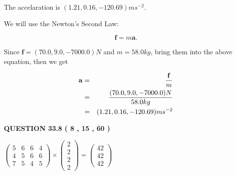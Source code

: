 \documentclass[12pt]{article}
\begin{document}
 
  The accelaration is $  %
(
1.21,
0.16,
-120.69)
ms^{-2} $.
 
 
 
 
 
 
\noindent{}

We will use the Newton's Second Law:
 
\[
\mathbf{f}=m\mathbf{a}.
\]
 
Since $\mathbf{f}= %
(70.0 , 9.0 , -7000.0) N$
and $m= %
58.0kg$, bring them into the above equation, then we get
 
\begin{eqnarray*}
\mathbf{a}&=&\frac{\mathbf{f}}m  \\
&=&\frac{ %
(70.0 , 9.0 , -7000.0) N}{ %
58.0kg}  \\
&=& %
(1.21 , 0.16 , -120.69) ms^{-2}
\end{eqnarray*}
 
 
 
  
\vspace{0.2in}
  
{\textbf{\Large{QUESTION
33.8 
 (           8 ,          15 ,          60 )
}}}
  
  
 
 
\noindent{}

 
$\left( \begin{array}{ccccccccccccccc}
           5  & 
           6  & 
           6  & 
           4  \\ 
           4  & 
           5  & 
           6  & 
           6  \\ 
           7  & 
           5  & 
           4  & 
           5
\end{array}\right) \times
\left( \begin{array}{c}
           2  \\ 
           2  \\ 
           2  \\ 
           2
\end{array}\right)  =
\left( \begin{array}{c}
          42  \\ 
          42  \\ 
          42
\end{array}\right)  $
 
\end{document}
